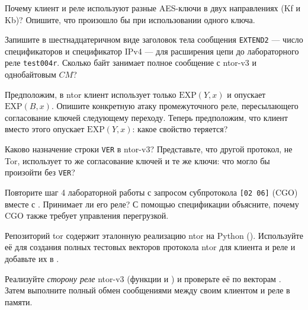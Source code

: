 \begin{esercizio}[1]\label{es:09-direzioni}
Почему клиент и реле используют разные AES-ключи в двух направлениях (Kf и Kb)? Опишите, что произошло бы при использовании одного ключа.
\end{esercizio}

\begin{esercizio}[2]\label{es:09-extend2}
Запишите в шестнадцатеричном виде заголовок тела сообщения \texttt{EXTEND2} --- число спецификаторов и спецификатор IPv4 --- для расширения цепи до лабораторного реле \texttt{test004r}. Сколько байт занимает полное сообщение с ntor-v3 и однобайтовым $CM$?
\end{esercizio}

\begin{esercizio}[2]\label{es:09-ds}
Предположим, в ntor клиент использует только $\mathrm{EXP}(Y, x)$ и опускает $\mathrm{EXP}(B, x)$. Опишите конкретную атаку промежуточного реле, пересылающего согласование ключей следующему переходу. Теперь предположим, что клиент вместо этого опускает $\mathrm{EXP}(Y, x)$: какое свойство теряется?
\end{esercizio}

\begin{esercizio}[2]\label{es:09-ver}
Каково назначение строки \texttt{VER} в ntor-v3? Представьте, что другой протокол, не Tor, использует то же согласование ключей и те же ключи: что могло бы произойти без \texttt{VER}?
\end{esercizio}

\begin{esercizio}[2]\label{es:09-cc}
Повторите шаг 4 лабораторной работы с запросом субпротокола \texttt{[02 06]} (CGO) вместе с . Принимает ли его реле? С помощью спецификации  объясните, почему CGO также требует управления перегрузкой.
\end{esercizio}

\begin{esercizio}[3]\label{es:09-ntor-ref}
Репозиторий tor содержит эталонную реализацию ntor на Python (). Используйте её для создания полных тестовых векторов протокола ntor для клиента и реле и добавьте их в .
\end{esercizio}

\begin{esercizio}[3]\label{es:09-relay}
Реализуйте \emph{сторону реле} ntor-v3 (функции  и ) и проверьте её по векторам . Затем выполните полный обмен сообщениями между своим клиентом и реле в памяти.
\end{esercizio}

